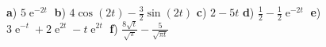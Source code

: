 {
{\textbf a)} $5\operatorname{e}^{-2t}                                             $
{\textbf b)} $4 \cos(2t)-\frac 32 \sin(2t)                          $
{\textbf c)} $ 2 - 5t                                               $
{\textbf d)} $\frac 12 - \frac 12 \operatorname{e}^{-2t}                          $
{\textbf e)} $3\operatorname{e}^{-t} +2\operatorname{e}^{2t} - t\operatorname{e}^{2t}                         $
{\textbf f)} $\frac{8\sqrt t }{\sqrt \pi} - \frac{5}{\sqrt{\pi t}}  $

}








